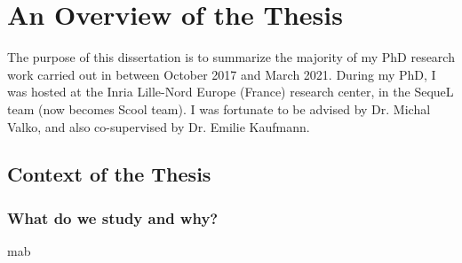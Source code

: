 \chapter{An Overview of the Thesis}\label{chap:intro}
	\minitoc
	\newpage





The purpose of this dissertation is to summarize the majority of my PhD research work carried out in between October 2017 and March 2021. During my PhD, I was hosted at the Inria Lille-Nord Europe (France) research center, in the SequeL team (now becomes Scool team). I was fortunate to be advised by Dr. Michal Valko, and also co-supervised by Dr. Emilie Kaufmann.

\section{Context of the Thesis}\label{sec:intro.context}
	
\subsection{What do we study and why?}\label{sec:intro.context.what}
	    
	\gls{mab}



